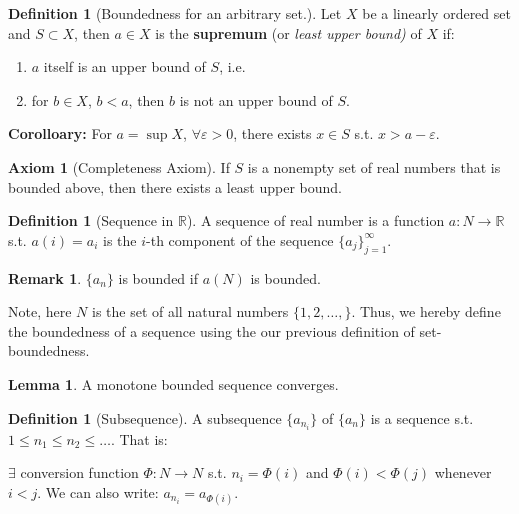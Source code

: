 \documentclass[12pt]{article}
\newcommand{\R}{{\mathbb R}}
\theoremstyle{definition}
\newtheorem{axiom}[theorem]{Axiom}
\newtheorem{definition}[theorem]{Definition}
\newtheorem{lemma}[theorem]{Lemma}
\newtheorem{remark}[theorem]{Remark}
\theoremstyle{plain}
\begin{document}
\begin{definition}
    [Boundedness for an arbitrary set.]

    Let $X$ be a linearly ordered set and $S \subset X$, then $a \in X$ is 
    the \textbf{supremum} (or \textit{least upper bound) }of $X$ if: 
    \begin{enumerate}
        \item $a$ itself is an upper bound of $S$, i.e. 
        \item for $b \in X$, $b < a$, then $b$ is not an upper bound of $S$.
    \end{enumerate}

    \textbf{Corolloary: } For $a = \sup X$, $\forall \varepsilon > 0$, there 
    exists $x \in S$ s.t. $x > a - \varepsilon$.
\end{definition}

\begin{axiom}
    [Completeness Axiom] 
    If $S$ is a nonempty set of real numbers that is bounded above, then there 
    exists a least upper bound.
\end{axiom}

\begin{definition}
    [Sequence in $\R$]
    A sequence of real number is a function $a : N \to \R$ s.t. $a(i) = a_i$ is 
    the $i$-th component of the sequence $\{a_j\}_{j=1}^\infty$.
\end{definition}

\begin{remark}
    $\{a_n\}$ is bounded if $a(N)$ is bounded.

    Note, here $N$ is the set of all natural numbers $\{1,2,\ldots,\}$. Thus, 
    we hereby define the boundedness of a sequence using the our previous 
    definition of set-boundedness.
\end{remark}

\begin{lemma}
    \label{lemma:1_B_W_Thm}
    A monotone bounded sequence converges.
\end{lemma}

\begin{definition}
    [Subsequence]

    A subsequence $\{a_{n_i}\}$ of $\{a_n\}$ is a sequence s.t. $1 \le n_1 \le 
    n_2 \le \ldots$. That is: 

    $ \exists $  conversion function $\Phi : N \to N$ s.t. $n_ i = \Phi(i)$ and 
    $\Phi(i) < \Phi(j)$ whenever $i < j$. We can also write: $a_{n_i} = 
    a_{\Phi(i)}$.
\end{definition}
\end{document}
